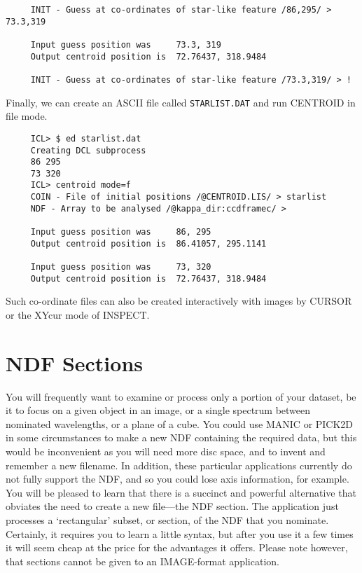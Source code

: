 {\begin{verbatim}
     INIT - Guess at co-ordinates of star-like feature /86,295/ > 73.3,319
 
     Input guess position was     73.3, 319
     Output centroid position is  72.76437, 318.9484
 
     INIT - Guess at co-ordinates of star-like feature /73.3,319/ > !
\end{verbatim}
\normalsize
Finally, we can create an ASCII file called {\tt STARLIST.DAT} and run
CENTROID in file mode.  

\small
\begin{verbatim}
     ICL> $ ed starlist.dat
     Creating DCL subprocess
     86 295
     73 320
     ICL> centroid mode=f
     COIN - File of initial positions /@CENTROID.LIS/ > starlist
     NDF - Array to be analysed /@kappa_dir:ccdframec/ >
 
     Input guess position was     86, 295
     Output centroid position is  86.41057, 295.1141
 
     Input guess position was     73, 320
     Output centroid position is  72.76437, 318.9484
\end{verbatim}
\normalsize
Such co-ordinate files can also be created interactively with images by
CURSOR or the XYcur mode of INSPECT.

\section{NDF Sections}
\label{se:ndfsect} 

You will frequently want to examine or process only a portion of your
dataset, be it to focus on a given object in an image, or a single
spectrum between nominated wavelengths, or a plane of a cube. You could
use MANIC or PICK2D in some circumstances to make a new NDF containing
the required data, but this would be inconvenient as you will need more
disc space, and to invent and remember a new filename. In addition,
these particular applications currently do not fully support the NDF,
and so you could lose axis information, for example.  You will be
pleased to learn that there is a succinct and powerful alternative that
obviates the need to create a new file---the NDF section.  The
application just processes a `rectangular' subset, or section, of the
NDF that you nominate.  Certainly, it requires you to learn a little
syntax, but after you use it a few times it will seem cheap at the price
for the advantages it offers.  Please note however, that sections cannot
be given to an IMAGE-format application. 

}
